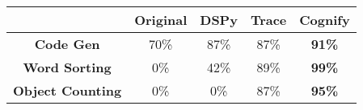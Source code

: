\begin{table}[h!]
\centering

\begin{tabular}{|c|c|c|c|c|}
\hline
\textbf{}            & \textbf{Original} & \textbf{DSPy} & \textbf{Trace} & \textbf{Cognify} \\ \hline
\textbf{Code Gen}     & 70\%              & 87\%          & 87\%           & \textbf{91\%}             \\ \hline
\textbf{Word Sorting} & 0\%               & 42\%           & 89\%           & \textbf{99\%}             \\ \hline
\textbf{Object Counting}     & 0\%               & 0\%          & 87\%           & \textbf{95\%}             \\ \hline
\end{tabular}
\label{tab:comparison}
\vspace{0.1in}
\end{table}
